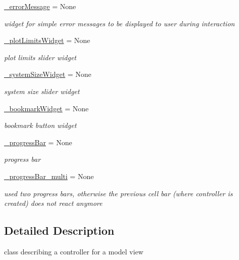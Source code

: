 \begin{DoxyCompactItemize}
\hyperlink{class_mu_mo_t_1_1_mu_mo_t_1_1_mu_mo_tcontroller_afb9cc1f1f0c08393b454f526842425cc}{\+\_\+error\+Message} = None
\begin{DoxyCompactList}\small\item\em widget for simple error messages to be displayed to user during interaction \end{DoxyCompactList}\item 
\hyperlink{class_mu_mo_t_1_1_mu_mo_t_1_1_mu_mo_tcontroller_a7f7ea1e7e5688cb25a6651783db498e0}{\+\_\+plot\+Limits\+Widget} = None
\begin{DoxyCompactList}\small\item\em plot limits slider widget \end{DoxyCompactList}\item 
\hyperlink{class_mu_mo_t_1_1_mu_mo_t_1_1_mu_mo_tcontroller_ab1e13c5ff312caa1398f9de296be2319}{\+\_\+system\+Size\+Widget} = None
\begin{DoxyCompactList}\small\item\em system size slider widget \end{DoxyCompactList}\item 
\hyperlink{class_mu_mo_t_1_1_mu_mo_t_1_1_mu_mo_tcontroller_ae7a084d9f77bbda4a99577633ef002ce}{\+\_\+bookmark\+Widget} = None
\begin{DoxyCompactList}\small\item\em bookmark button widget \end{DoxyCompactList}\item 
\hyperlink{class_mu_mo_t_1_1_mu_mo_t_1_1_mu_mo_tcontroller_a018864aa22d2adb0d3958fb0adbce8e2}{\+\_\+progress\+Bar} = None
\begin{DoxyCompactList}\small\item\em progress bar \end{DoxyCompactList}\item 
\hyperlink{class_mu_mo_t_1_1_mu_mo_t_1_1_mu_mo_tcontroller_a1da52cde6b2b94a1005eaa6898d2f8c5}{\+\_\+progress\+Bar\+\_\+multi} = None
\begin{DoxyCompactList}\small\item\em used two progress bars, otherwise the previous cell bar (where controller is created) does not react anymore \end{DoxyCompactList}\end{DoxyCompactItemize}


\subsection{Detailed Description}
class describing a controller for a model view 

